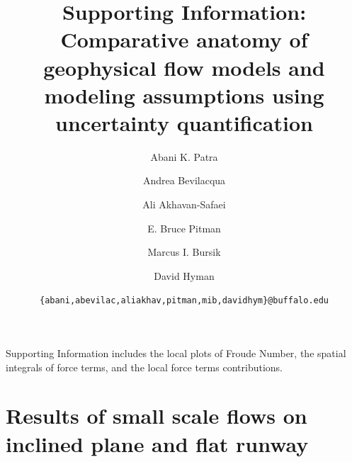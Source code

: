 \documentclass{article}
\begin{document}
\title{\bf Supporting Information: Comparative anatomy of geophysical flow models and modeling assumptions using uncertainty quantification}
\author[1,3]{Abani K. Patra}
\author[2]{Andrea Bevilacqua}
\author[1]{Ali Akhavan-Safaei}
\author[4]{E. Bruce Pitman}
\author[2]{Marcus I. Bursik}
\author[2]{David Hyman}


\date{\texttt{\{abani,abevilac,aliakhav,pitman,mib,davidhym\}@buffalo.edu}}

\maketitle
\tableofcontents
\newpage
Supporting Information includes the local plots of Froude Number, the spatial integrals of force terms, and the local force terms contributions.

\section{Results of small scale flows on inclined plane and flat runway}
\end{document}
